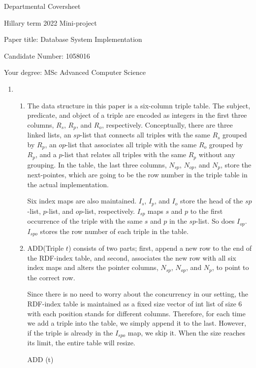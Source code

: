 \documentclass{article}
\begin{document}
Departmental Coversheet

Hillary term 2022
Mini-project

Paper title: Database System Implementation

Candidate Number: 1058016

Your degree: MSc Advanced Computer Science

\newpage

\begin{enumerate}
	\item 
	\begin{enumerate}
	\item 
	The data structure in this paper is a six-column triple table. The subject, predicate, and object of a triple are encoded as integers in the first three columns, $R_s$, $R_p$, and $R_o$, respectively. Conceptually, there are three linked lists, an $sp$-list that connects all triples with the same $R_s$ grouped by $R_p$, an $op$-list that associates all triple with the same $R_o$ grouped by $R_p$, and a $p$-list that relates all triples with the same $R_p$ without any grouping. In the table, the last three columns, $N_{sp}$, $N_{op}$, and $N_p$, store the next-pointes, which are going to be the row number in the triple table in the actual implementation.
	
	Six index maps are also maintained. $I_s$, $I_p$, and $I_o$ store the head of the $sp$-list, $p$-list, and $op$-list, respectively. $I_{sp}$ maps $s$ and $p$ to the first occurrence of the triple with the same $s$ and $p$ in the $sp$-list. So does $I_{op}$. $I_{spo}$ stores the row number of each triple in the table. 
	
	\item {\large A}DD(Triple $t$) consists of two parts; first, append a new row to the end of the RDF-index table, and second, associates the new row with all six index maps and alters the pointer columns, $N_{sp}$, $N_{op}$, and $N_p$, to point to the correct row.
	
	Since there is no need to worry about the concurrency in our setting, the RDF-index table is maintained as a fixed size vector of int list of size 6 with each position stands for different columns. Therefore, for each time we add a triple into the table, we simply append it to the last. However, if the triple is already in the $I_{spo}$ map, we skip it. When the size reaches its limit, the entire table will resize. 

\begin{algorithm}[H]
\caption{ADD (t)}\label{alg:cap}
\begin{algorithmic}


\end{algorithmic}
\end{algorithm}
\end{enumerate}
\end{enumerate}
\end{document}
